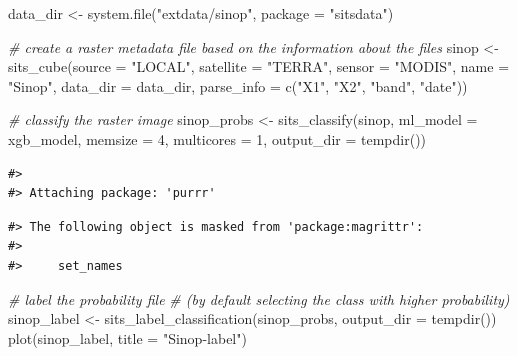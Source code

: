 \documentclass[a4paper,]{tufte-book}
\newenvironment{Shaded}{}{}
\newcommand{\AttributeTok}[1]{\textcolor[rgb]{0.49,0.56,0.16}{#1}}
\newcommand{\CommentTok}[1]{\textcolor[rgb]{0.38,0.63,0.69}{\textit{#1}}}
\newcommand{\DecValTok}[1]{\textcolor[rgb]{0.25,0.63,0.44}{#1}}
\newcommand{\FunctionTok}[1]{\textcolor[rgb]{0.02,0.16,0.49}{#1}}
\newcommand{\NormalTok}[1]{#1}
\newcommand{\OtherTok}[1]{\textcolor[rgb]{0.00,0.44,0.13}{#1}}
\newcommand{\StringTok}[1]{\textcolor[rgb]{0.25,0.44,0.63}{#1}}
\begin{document}
\begin{Shaded}
\begin{Highlighting}[]
\NormalTok{data\_dir }\OtherTok{\textless{}{-}} \FunctionTok{system.file}\NormalTok{(}\StringTok{"extdata/sinop"}\NormalTok{, }\AttributeTok{package =} \StringTok{"sitsdata"}\NormalTok{)}

\CommentTok{\# create a raster metadata file based on the information about the files}
\NormalTok{sinop }\OtherTok{\textless{}{-}} \FunctionTok{sits\_cube}\NormalTok{(}\AttributeTok{source =} \StringTok{"LOCAL"}\NormalTok{,}
                   \AttributeTok{satellite =} \StringTok{"TERRA"}\NormalTok{,}
                   \AttributeTok{sensor  =} \StringTok{"MODIS"}\NormalTok{,}
                   \AttributeTok{name =} \StringTok{"Sinop"}\NormalTok{,}
                   \AttributeTok{data\_dir =}\NormalTok{ data\_dir,}
                   \AttributeTok{parse\_info =} \FunctionTok{c}\NormalTok{(}\StringTok{"X1"}\NormalTok{, }\StringTok{"X2"}\NormalTok{, }\StringTok{"band"}\NormalTok{, }\StringTok{"date"}\NormalTok{))}

\CommentTok{\# classify the raster image}
\NormalTok{sinop\_probs }\OtherTok{\textless{}{-}} \FunctionTok{sits\_classify}\NormalTok{(sinop, }\AttributeTok{ml\_model =}\NormalTok{ xgb\_model, }
                             \AttributeTok{memsize =} \DecValTok{4}\NormalTok{, }\AttributeTok{multicores =} \DecValTok{1}\NormalTok{, }
                             \AttributeTok{output\_dir =} \FunctionTok{tempdir}\NormalTok{())}
\end{Highlighting}
\end{Shaded}

\begin{verbatim}
#> 
#> Attaching package: 'purrr'
\end{verbatim}

\begin{verbatim}
#> The following object is masked from 'package:magrittr':
#> 
#>     set_names
\end{verbatim}

\begin{Shaded}
\begin{Highlighting}[]
\CommentTok{\# label the probability file }
\CommentTok{\# (by default selecting the class with higher probability)}
\NormalTok{sinop\_label }\OtherTok{\textless{}{-}} \FunctionTok{sits\_label\_classification}\NormalTok{(sinop\_probs, }\AttributeTok{output\_dir =} \FunctionTok{tempdir}\NormalTok{())}
\FunctionTok{plot}\NormalTok{(sinop\_label, }\AttributeTok{title =} \StringTok{"Sinop{-}label"}\NormalTok{)}
\end{Highlighting}
\end{Shaded}
\end{document}
